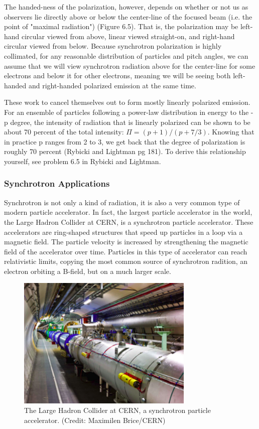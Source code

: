 \documentclass{article}
\begin{document}
The handed-ness of the polarization, however, depends on whether or not us as observers lie directly above or below the center-line of the focused beam (i.e. the point of "maximal radiation") (Figure 6.5). That is, the polarization may be left-hand circular viewed from above, linear viewed straight-on, and right-hand circular viewed from below. Because synchrotron polarization is highly collimated, for any reasonable distribution of particles and pitch angles, we can assume that we will view synchrotron radiation above for the center-line for some electrons and below it for other electrons, meaning we will be seeing both left-handed and right-handed polarized emission at the same time.

These work to cancel themselves out to form mostly linearly polarized emission. For an ensemble of particles following a power-law distribution in energy to the - p degree, the intensity of radiation that is linearly polarized can be shown to be about 70 percent of the total intensity: $\Pi = (p+1) / (p + 7/3)$. Knowing that in practice p ranges from 2 to 3, we get back that the degree of polarization is roughly 70 percent (Rybicki and Lightman pg 181). To derive this relationship yourself, see problem 6.5 in Rybicki and Lightman.

\subsubsection{Synchrotron Applications}

Synchrotron is not only a kind of radiation, it is also a very common type of modern particle accelerator. In fact, the largest particle accelerator in the world, the Large Hadron Collider at CERN, is a synchrotron particle accelerator. These accelerators are ring-shaped structures that speed up particles in a loop via a magnetic field. The particle velocity is increased by strengthening the magnetic field of the accelerator over time. Particles in this type of accelerator can reach relativistic limits, copying the most common source of synchrotron radition, an electron orbiting a B-field, but on a much larger scale.


\begin{figure}
    \centering
    \includegraphics[width=0.75\textwidth]{figures/250px-Lhc.png}
    \caption{The Large Hadron Collider at CERN, a synchrotron particle accelerator. (Credit: Maximilen Brice/CERN)}
    \label{fig:LHC.}
\end{figure}
\end{document}
